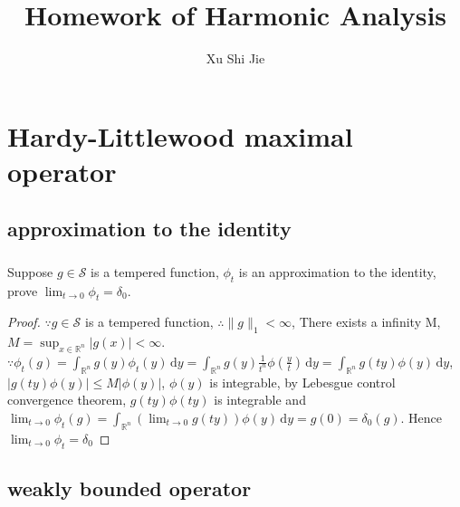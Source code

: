 \documentclass{amsart}
\theoremstyle{definition}
\theoremstyle{remark}
\numberwithin{equation}{section}
\begin{document}
	\title{Homework of Harmonic Analysis}
	\author{Xu Shi Jie}
	\maketitle
\section{Hardy-Littlewood maximal operator}
\subsection{approximation to the identity}
\subsubsection{}
Suppose $g\in \mathcal{S}$ is a tempered function, $\phi_t$ is an approximation to the identity, prove $ \lim_{t\to 0}\phi_t=\delta_0$.
\begin{proof}
	$\because g\in\mathcal{S}$ is a tempered function, $\therefore \| g\|_1<\infty$, There exists a infinity M, $M=\sup_{x\in \mathbb{R}^n}|g(x)|<\infty$.
	$\because \phi_t(g)=\int_{\mathbb{R}^n}g(y)\phi_t(y)\, \mathrm{d}y=\int_{\mathbb{R}^n}g(y)\frac{1}{t^n}\phi(\frac{y}{t})\,\mathrm{d}y=\int_{\mathbb{R}^n}g(ty)\phi(y)\,\mathrm{d}y$, $|g(ty)\phi(y)|\leq M|\phi(y)|$, $\phi(y)$ is integrable, by Lebesgue control convergence theorem, $g(ty)\phi(ty)$ is integrable and \\$\lim_{t\to 0}\phi_t(g)=\int_{\mathbb{R}^n}(\lim_{t\to 0}g(ty))\phi(y)\,\mathrm{d}y=g(0)=\delta_0(g)$. Hence $\lim_{t\to 0}\phi_t=\delta_0$
\end{proof}
\subsection{weakly bounded operator}
\end{document}
